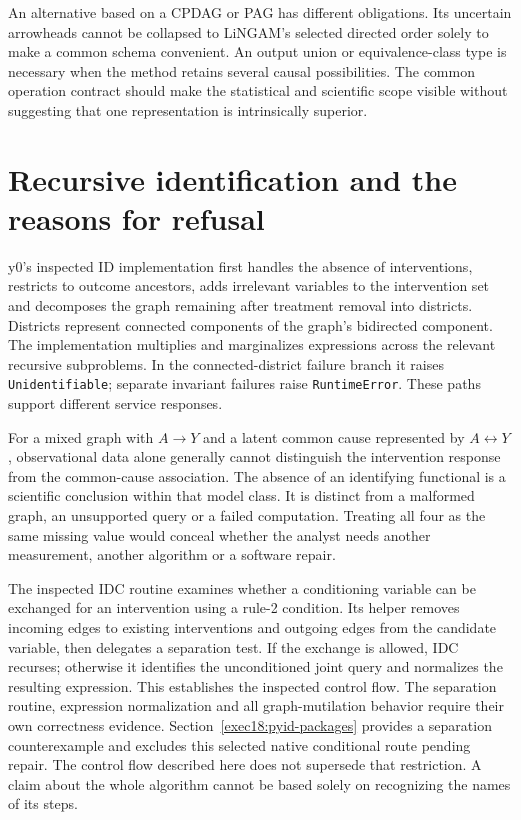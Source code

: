An alternative based on a CPDAG or PAG has different obligations. Its uncertain
arrowheads cannot be collapsed to LiNGAM's selected directed order solely to
make a common schema convenient. An output union or equivalence-class type is
necessary when the method retains several causal possibilities. The common
operation contract should make the statistical and scientific scope visible
without suggesting that one representation is intrinsically superior.

\section{Recursive identification and the reasons for refusal}

y0's inspected ID implementation first handles the absence of interventions,
restricts to outcome ancestors, adds irrelevant variables to the intervention
set and decomposes the graph remaining after treatment removal into districts.
Districts represent connected components of the graph's bidirected component.
The implementation multiplies and marginalizes expressions across the relevant
recursive subproblems. In the connected-district failure branch it raises
\texttt{Unidentifiable}; separate invariant failures raise \texttt{RuntimeError}.
These paths support different service responses. \cite{v131_sw_y0}

For a mixed graph with $A\to Y$ and a latent common cause represented by
$A\leftrightarrow Y$, observational data alone generally cannot distinguish
the intervention response from the common-cause association. The absence of an
identifying functional is a scientific conclusion within that model class.
It is distinct from a malformed graph, an unsupported query or a failed
computation. Treating all four as the same missing value would conceal whether
the analyst needs another measurement, another algorithm or a software repair.

The inspected IDC routine examines whether a conditioning variable can be
exchanged for an intervention using a rule-2 condition. Its helper removes
incoming edges to existing interventions and outgoing edges from the candidate
variable, then delegates a separation test. If the exchange is allowed, IDC
recurses; otherwise it identifies the unconditioned joint query and normalizes
the resulting expression. This establishes the inspected control flow. The
separation routine, expression normalization and all graph-mutilation behavior
require their own correctness evidence. Section~\ref{exec18:pyid-packages}
provides a separation counterexample and excludes this selected native
conditional route pending repair. The control flow described here does not
supersede that restriction. A claim about the whole algorithm cannot be based
solely on recognizing the names of its steps.
\cite{v131_sw_y0}

